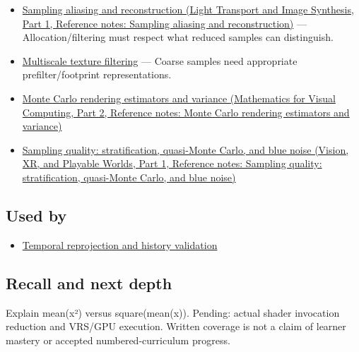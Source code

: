\hypertarget{appendix-4192b2bdd21e-prerequisites}{}

\begin{itemize}
\tightlist
\item
  \href{../04-Light-Transport-and-Image-Synthesis-P01/main.pdf\#nameddest=appendix-6a7869dd79a6}{Sampling aliasing and reconstruction (Light Transport and Image Synthesis, Part 1, Reference notes: Sampling aliasing and reconstruction)} --- Allocation/filtering must respect what reduced samples can distinguish.
\item
  \hyperref[appendix-b677a85ba76f]{Multiscale texture filtering} --- Coarse samples need appropriate prefilter/footprint representations.
\item
  \href{../02-Mathematics-for-Visual-Computing-P02/main.pdf\#nameddest=appendix-031e02bf28af}{Monte Carlo rendering estimators and variance (Mathematics for Visual Computing, Part 2, Reference notes: Monte Carlo rendering estimators and variance)}
\item
  \href{../07-Vision-XR-and-Playable-Worlds-P01/main.pdf\#nameddest=appendix-9f693ffd82bc}{Sampling quality: stratification, quasi-Monte Carlo, and blue noise (Vision, XR, and Playable Worlds, Part 1, Reference notes: Sampling quality: stratification, quasi-Monte Carlo, and blue noise)}
\end{itemize}

\subsection{Used by}\label{appendix-4192b2bdd21e-used-by}

\hypertarget{appendix-4192b2bdd21e-used-by}{}

\begin{itemize}
\tightlist
\item
  \hyperref[appendix-0727340a4428]{Temporal reprojection and history validation}
\end{itemize}

\subsection{Recall and next depth}\label{appendix-4192b2bdd21e-recall-and-next-depth}

\hypertarget{appendix-4192b2bdd21e-recall-and-next-depth}{}

Explain mean(x²) versus square(mean(x)). Pending: actual shader invocation reduction and VRS/GPU execution. Written coverage is not a claim of learner mastery or accepted numbered-curriculum progress.

